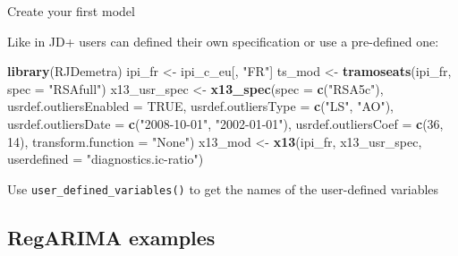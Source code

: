 \documentclass[10pt,xcolor=table,color={dvipsnames,usenames},ignorenonframetext,usepdftitle=false,french]{beamer}
\newenvironment{Shaded}{\begin{snugshade}}{\end{snugshade}}
\newcommand{\DataTypeTok}[1]{\textcolor[rgb]{0.13,0.29,0.53}{#1}}
\newcommand{\DecValTok}[1]{\textcolor[rgb]{0.00,0.00,0.81}{#1}}
\newcommand{\KeywordTok}[1]{\textcolor[rgb]{0.13,0.29,0.53}{\textbf{#1}}}
\newcommand{\NormalTok}[1]{#1}
\newcommand{\OtherTok}[1]{\textcolor[rgb]{0.56,0.35,0.01}{#1}}
\newcommand{\StringTok}[1]{\textcolor[rgb]{0.31,0.60,0.02}{#1}}
\begin{document}
\begin{frame}[fragile]{Create your first model}
\protect\hypertarget{create-your-first-model}{}

Like in JD+ users can defined their own specification or use a
pre-defined one:

\footnotesize

\begin{Shaded}
\begin{Highlighting}[]
\KeywordTok{library}\NormalTok{(RJDemetra)}
\NormalTok{ipi_fr <-}\StringTok{ }\NormalTok{ipi_c_eu[, }\StringTok{"FR"}\NormalTok{]}
\NormalTok{ts_mod <-}\StringTok{ }\KeywordTok{tramoseats}\NormalTok{(ipi_fr, }\DataTypeTok{spec =} \StringTok{"RSAfull"}\NormalTok{)}
\NormalTok{x13_usr_spec <-}\StringTok{ }\KeywordTok{x13_spec}\NormalTok{(}\DataTypeTok{spec =} \KeywordTok{c}\NormalTok{(}\StringTok{"RSA5c"}\NormalTok{),}
                         \DataTypeTok{usrdef.outliersEnabled =} \OtherTok{TRUE}\NormalTok{,}
                         \DataTypeTok{usrdef.outliersType =} \KeywordTok{c}\NormalTok{(}\StringTok{"LS"}\NormalTok{, }\StringTok{"AO"}\NormalTok{),}
                         \DataTypeTok{usrdef.outliersDate =} \KeywordTok{c}\NormalTok{(}\StringTok{"2008-10-01"}\NormalTok{,}
                                                 \StringTok{"2002-01-01"}\NormalTok{),}
                         \DataTypeTok{usrdef.outliersCoef =} \KeywordTok{c}\NormalTok{(}\DecValTok{36}\NormalTok{, }\DecValTok{14}\NormalTok{),}
                         \DataTypeTok{transform.function =} \StringTok{"None"}\NormalTok{)}
\NormalTok{x13_mod <-}\StringTok{ }\KeywordTok{x13}\NormalTok{(ipi_fr, x13_usr_spec, }\DataTypeTok{userdefined =} \StringTok{"diagnostics.ic-ratio"}\NormalTok{)}
\end{Highlighting}
\end{Shaded}

Use \texttt{user\_defined\_variables()} to get the names of the
user-defined variables

\end{frame}

\hypertarget{regarima-examples}{%
\subsection{RegARIMA examples}\label{regarima-examples}}
\end{document}
